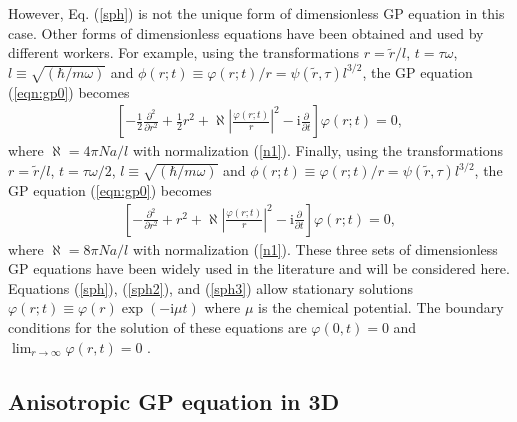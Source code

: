 \documentclass[onecolumn]{elsart3p}
\begin{document}
However, Eq. (\ref{sph}) is not the unique form of dimensionless GP equation in
this case. Other forms of dimensionless equations have been obtained and used by
different workers. For example, using  the transformations
$r =\tilde r/l$,
$t=\tau \omega$, $l\equiv \sqrt {(\hbar/m\omega)} $ and $\phi(r;t)
\equiv \varphi(r;t)/r =\psi(\tilde r,\tau)l^{3/2}$, the GP equation
(\ref{eqn:gp0}) becomes
\begin{align}
\left[-\frac{1}{2}\frac{\partial^2}
{\partial r^2}+\frac{1}{2}{r^2}+\aleph        %
\left| \frac{\varphi(r;t)}{r}
\right| ^2 -
\mbox{i}\frac{\partial }{\partial t}\right] \varphi
(r;t)=0,
\label{sph2}
\end{align}
where $\aleph %
=4\pi  N a/l$ with normalization (\ref{n1}).
Finally, using
the transformations
$r =\tilde r/l$,
$t=\tau \omega/2$, $l\equiv \sqrt {(\hbar/m\omega)} $ and $\phi(r;t)
\equiv \varphi(r;t)/r =\psi(\tilde r,\tau)l^{3/2}$, the GP equation
(\ref{eqn:gp0}) becomes
\begin{align}
\left[-\frac{\partial^2}
{\partial r^2}+{r^2}+\aleph  %
\left| \frac{\varphi(r;t)}{r}
\right| ^2 -
\mbox{i}\frac{\partial }{\partial t}\right] \varphi
(r;t)=0,
\label{sph3}
\end{align}
where $  \aleph %
=8\pi  N a/l$ with normalization (\ref{n1}). These three sets of
dimensionless GP equations have been {widely} used in the
literature and will be considered here. Equations (\ref{sph}), (\ref{sph2}), and
(\ref{sph3}) allow stationary solutions $\varphi(r;t)\equiv
\varphi(r)\exp(-\mbox{i}\mu t)$ where  $\mu$ is the chemical potential. The
boundary conditions for the solution of these equations are $\varphi(0,t)=0$ and
$\lim_{r\to \infty}\varphi(r,t)=0 $ \cite{koonin}.



\subsection{Anisotropic GP equation in 3D}
\end{document}
